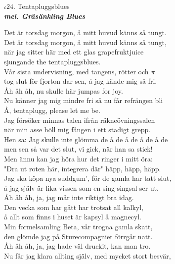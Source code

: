 \documentclass[a6paper,10pt]{article}
\newcommand{\mel}[1]{\small\textbf{\textit{mel. #1 \\}}}
\begin{document}
\setlength{\oddsidemargin}{-0.47in}
\noindent
\begin{center}
\Large $\iota24$. Tentapluggsblues\\
\mel{Gräsänkling Blues}
\end{center}
Det är torsdag morgon, å mitt huvud känns så tungt. \\
Det är torsdag morgon, å mitt huvud känns så tungt, \\
när jag sitter här med ett glas grapefruktjuice \\
sjungande the tentapluggsblues. 
\vspace{5pt} \\
Vår sista undervisning, med tangens, rötter och $\pi$ \\
tog slut för fjorton dar sen, å jag kände mig så fri. \\
Åh åh åh, nu skulle här jumpas for joy. \\
Nu känner jag mig mindre fri så nu får refrängen bli \\
Å, tentaplugg, please let me be. 
\vspace{5pt} \\
Jag försöker minnas talen ifrån räkneövningssalen \\
när min asse höll mig fången i ett stadigt grepp. \\
Hen sa: Jag skulle inte glömma de å de å de å de å de \\
men sen så var det slut, vi gick, när han sa stick! \\
Men ännu kan jag höra hur det ringer i mitt öra: \\
"Dra ut roten här, integrera där" häpp, häpp, häpp. 
\vspace{5pt} \\
Jag ska köpa nya suddgum', för de gamla har tatt slut, \\
å jag själv är lika vissen som en sing-singsal ser ut. \\
Åh åh åh, ja, jag mår inte riktigt bra idag. \\
Den vecka som har gått har trotsat all kalkyl, \\
å allt som finns i huset är kapsyl å magnecyl. 
\vspace{5pt} \\
Min formelsamling Beta, vår trogna gamla skatt, \\
den glömde jag på Sturecompagniet förrgår natt.  \\
Åh åh åh, ja, jag hade väl druckit, kan man tro. \\
Nu får jag klara allting själv, med mycket stort besvär, \\
\end{document}
